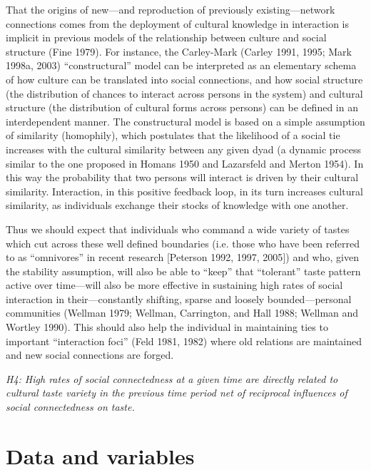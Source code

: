 That the origins of new---and reproduction of previously existing---network connections comes from the deployment of cultural knowledge in interaction is implicit in previous models of the relationship between culture and social structure (Fine 1979). For instance, the Carley-Mark (Carley 1991, 1995; Mark 1998a, 2003) ``constructural'' model can be interpreted as an elementary schema of how culture can be translated into social connections, and how social structure (the distribution of chances to interact across persons in the system) and cultural structure (the distribution of cultural forms across persons) can be defined in an interdependent manner. The constructural model is based on a simple assumption of similarity (homophily), which postulates that the likelihood of a social tie increases with the cultural similarity between any given dyad (a dynamic process similar to the one proposed in Homans 1950 and Lazarsfeld and Merton 1954). In this way the probability that two persons will interact is driven by their cultural similarity. Interaction, in this positive feedback loop, in its turn increases cultural similarity, as individuals exchange their stocks of knowledge with one another.

Thus we should expect that individuals who command a wide variety of tastes which cut across these well defined boundaries (i.e. those who have been referred to as ``omnivores'' in recent research {[}Peterson 1992, 1997, 2005{]}) and who, given the stability assumption, will also be able to ``keep'' that ``tolerant'' taste pattern active over time---will also be more effective in sustaining high rates of social interaction in their---constantly shifting, sparse and loosely bounded---personal communities (Wellman 1979; Wellman, Carrington, and Hall 1988; Wellman and Wortley 1990). This should also help the individual in maintaining ties to important ``interaction foci'' (Feld 1981, 1982) where old relations are maintained and new social connections are forged.

\emph{H4: High rates of social connectedness at a given time are directly related to cultural taste variety in the previous time period net of reciprocal influences of social connectedness on taste.}

\section{Data and variables}\label{data-and-variables}


